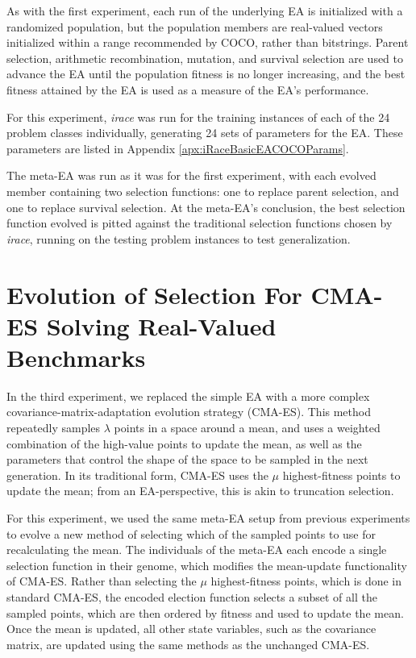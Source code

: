 \documentclass[times,12pt,titlepage]{mstogs}
\begin{document}
\begin{ThesisBody}
As with the first experiment, each run of the underlying EA is initialized with a randomized population, but the population members are real-valued vectors initialized within a range recommended by COCO, rather than bitstrings. Parent selection, arithmetic recombination, mutation, and survival selection are used to advance the EA until the population fitness is no longer increasing, and the best fitness attained by the EA is used as a measure of the EA's performance.

For this experiment, \textit{irace} was run for the training instances of each of the 24 problem classes individually, generating 24 sets of parameters for the EA. These parameters are listed in Appendix \ref{apx:iRaceBasicEACOCOParams}. 

The meta-EA was run as it was for the first experiment, with each evolved member containing two selection functions: one to replace parent selection, and one to replace survival selection. At the meta-EA's conclusion, the best selection function evolved is pitted against the traditional selection functions chosen by \textit{irace}, running on the testing problem instances to test generalization.

\section{Evolution of Selection For CMA-ES Solving Real-Valued Benchmarks}
\label{Evolution of Selection For CMA-ES Solving Real-Valued Benchmarks}

In the third experiment, we replaced the simple EA with a more complex covariance-matrix-adaptation evolution strategy (CMA-ES). This method repeatedly samples $\lambda$ points in a space around a mean, and uses a weighted combination of the high-value points to update the mean, as well as the parameters that control the shape of the space to be sampled in the next generation. In its traditional form, CMA-ES uses the $\mu$ highest-fitness points to update the mean; from an EA-perspective, this is akin to truncation selection. 

For this experiment, we used the same meta-EA setup from previous experiments to evolve a new method of selecting which of the sampled points to use for recalculating the mean. The individuals of the meta-EA each encode a single selection function in their genome, which modifies the mean-update functionality of CMA-ES. Rather than selecting the $\mu$ highest-fitness points, which is done in standard CMA-ES, the encoded election function selects a subset of all the sampled points, which are then ordered by fitness and used to update the mean. Once the mean is updated, all other state variables, such as the covariance matrix, are updated using the same methods as the unchanged CMA-ES.


\end{ThesisBody}
\end{document}
